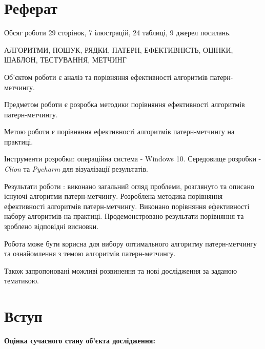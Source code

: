 \documentclass[a4paper,14pt]{extarticle} %
\begin{document}
	
	\newpage

	\section*{Реферат}

	Обсяг роботи 29 сторінок, 7 ілюстрацій, 24 таблиці, 9 джерел посилань.

	АЛГОРИТМИ, ПОШУК, РЯДКИ, ПАТЕРН,
	ЕФЕКТИВНІСТЬ, ОЦІНКИ, ШАБЛОН, ТЕСТУВАННЯ, МЕТЧИНГ

	Об'єктом роботи є аналіз та порівняння ефективності алгоритмів патерн-метчингу.
	
	Предметом роботи є розробка методики порівняння ефективності алгоритмів патерн-метчингу.

	Метою роботи є порівняння ефективності алгоритмів патерн-метчингу на практиці. 

	Інструменти розробки: операційна система - Windows 10. Середовище розробки - \textit{Clion} та \textit{Pycharm} для візуалізації результатів.

	Результати роботи : виконано загальний огляд проблеми, розглянуто та описано існуючі алгоритми патерн-метчингу.
	Розроблена методика порівняння ефективності алгоритмів патерн-метчингу. Виконано порівняння ефективності набору алгоритмів на практиці.
	Продемонстровано результати порівняння та зроблено відповідні висновки.

	Робота може бути корисна для вибору оптимального алгоритму патерн-метчингу та ознайомлення з темою алгоритмів патерн-метчингу.

	Також запропоновані можливі розвинення та нові дослідження за заданою тематикою.

	\newpage

    \tableofcontents


    \newpage
    
    \section*{Вступ}

	\textbf{Оцінка сучасного стану об’єкта дослідження:}
	
\end{document}
